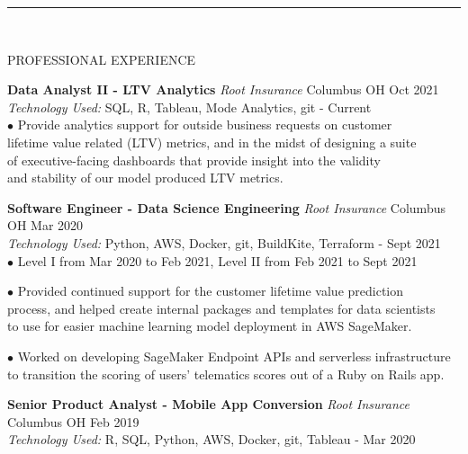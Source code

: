 \documentclass[12pt]{article}
\newcommand\tab[1][1cm]{\hspace*{#1}}
\newcommand\header[1][Section Header]{
    \vspace*{-2mm}
    \rule{6.5in}{3pt} \\
    \smallskip
    \begin{large}
	    \textsc{\textcolor{lblue}{#1}}
    \end{large}
    \medskip
}
\begin{document}
  \begin{flushleft}
    \header[PROFESSIONAL EXPERIENCE]

    \textbf{Data Analyst II - LTV Analytics} \tab[.25cm] \textit{Root Insurance} \tab[.15cm] \small {Columbus OH} \hfill \small {Oct 2021} \\
    \tab[0.5cm] \textit{Technology Used:} SQL, R, Tableau, Mode Analytics, git \hfill \small {{-} Current} \\

    \tab $\bullet$ Provide analytics support for outside business requests on customer \\
    \tab[1.25cm] lifetime value related (LTV) metrics, and in the midst of designing a suite \\
    \tab[1.25cm] of executive-facing dashboards that provide insight into the validity \\
    \tab[1.25cm] and stability of our model produced LTV metrics.
    \medskip

    \textbf{Software Engineer - Data Science Engineering} \tab[.25cm] \textit{Root Insurance} \tab[.15cm] \small {Columbus OH} \hfill \small {Mar 2020} \\
    \tab[0.5cm] \textit{Technology Used:} Python, AWS, Docker, git, BuildKite, Terraform \hfill \small {{-} Sept 2021} \\

    \tab $\bullet$ Level I from Mar 2020 to Feb 2021, Level II from Feb 2021 to Sept 2021 \\
    \medskip

    \tab $\bullet$ Provided continued support for the customer lifetime value prediction \\
    \tab[1.25cm] process, and helped create internal packages and templates for data scientists \\
    \tab[1.25cm] to use for easier machine learning model deployment in AWS SageMaker. \\
    \vspace*{0.5mm}

    \tab $\bullet$ Worked on developing SageMaker Endpoint APIs and serverless infrastructure \\
    \tab[1.25cm] to transition the scoring of users' telematics scores out of a Ruby on Rails app. \\
    \medskip

    \textbf{Senior Product Analyst - Mobile App Conversion} \tab[.25cm] \textit{Root Insurance} \tab[.15cm] \small{Columbus OH}  \hfill \small{Feb 2019} \\
    \tab[0.5cm] \textit{Technology Used:} R, SQL, Python, AWS, Docker, git, Tableau \hfill \small{{-} Mar 2020} \\


\end{flushleft}
\end{document}

